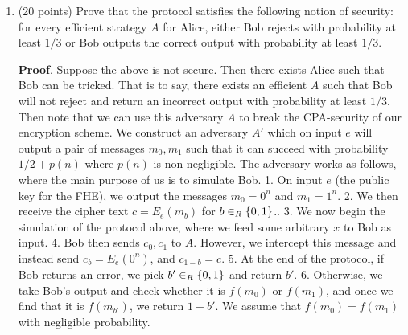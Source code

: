 \documentclass{article}
\begin{document}
\begin{enumerate}[noitemsep,topsep=\mdcompacttopsep,label=\alph*.]%

\item{}
(20 points) Prove that the protocol satisfies the following notion of security: for every efficient strategy $A$ for Alice, either Bob rejects with probability at least $1/3$ or Bob outputs the correct output with probability at least $1/3$.%

\begin{mdbmarginx}{1ex}{0pt}{1ex}{0pt}%
\noindent{}\textbf{Proof}.   Suppose the above is not secure. Then there exists Alice such that Bob can be tricked. That is to say,
 there exists an efficient $A$ such that Bob will not reject and return an incorrect output with
 probability at least $1/3$. Then note that we can use this adversary $A$ to break the CPA-security
 of our encryption scheme. We construct an adversary $A'$ which on input $e$ will output a pair
 of messages $m_0,m_1$ such that it can succeed with probability $1/2 + p(n)$ where $p(n)$ is non-negligible.
 The adversary works as follows, where the main purpose of us is to simulate Bob. 
 \mdbr
{}   1. On input $e$ (the public key for the FHE), we output the messages $m_0 = 0^n$ and $m_1 = 1^n$. 
   2. We then receive the cipher text $c = E_e(m_b)$ for $b \in_R \{0,1\}$.. 
   3. We now begin the simulation of the protocol above, where we feed some arbitrary $x$ to Bob as input.
   4. Bob then sends $c_0,c_1$ to $A$. However, we intercept this message and instead send $c_b = E_e(0^n)$, and $c_{1-b} = c$.
   5. At the end of the protocol, if Bob returns an error, we pick $b' \in_R \{0,1\}$ and return $b'$.
   6. Otherwise, we take Bob's output and check whether it is $f(m_0)$ or $f(m_1)$, and 
   once we find that it is $f(m_{b'})$, we return $1-b'$. We assume that $f(m_0) = f(m_1)$ with negligible probability.

\end{mdbmarginx}
\end{enumerate}
\end{document}
